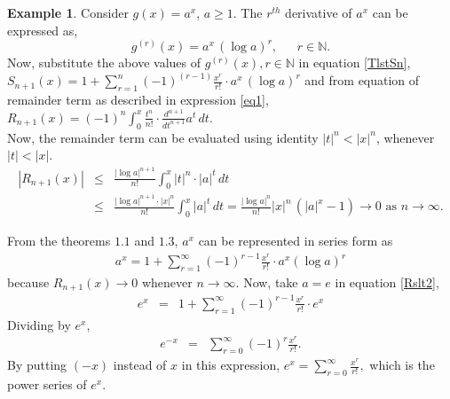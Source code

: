 \documentclass{amsart}
\theoremstyle{definition}
\newtheorem{example}[theorem]{Example}
\theoremstyle{remark}
\numberwithin{equation}{section}
\begin{document}

\begin{example}
Consider $g(x)=a^x$, $a \geq1$. The $r^{th}$ derivative of $a^x$ can be expressed as,
\begin{equation*}
  g^{(r)}(x)=a^x \, (\log a)^r ,~~~~~~~ r\in \mathbb{N}.
\end{equation*}
Now, substitute the above values of $g^{(r)}(x), r\in \mathbb{N}$ in equation \eqref{TlstSn},\\
 $\displaystyle{ S_{n+1}(x)=1+\sum_{r=1}^n (-1)^{(r-1)} \frac{x^r}{r!} \cdot a^x \, (\log a)^r}$
 and from equation of remainder term as described in expression \eqref{eq1},
$\displaystyle{ R_{n+1}(x)=(-1)^n \int_0^x \frac{t^n}{n!} \cdot \frac{d^{n+1}}{dt^{n+1}} a^t \, dt}$.\\
Now, the remainder term can be evaluated using identity $|t|^n < |x|^n$, whenever $|t|<|x|$.
\begin{eqnarray*}
|R_{n+1}(x)| &\leq & \frac{| \log a|^{n+1}}{n!} \int_0^x |t|^n \cdot |a|^t \, dt \\
&\leq & \frac{| \log a|^{n+1} \cdot |x|^n}{n!} \int_0^x  |a|^t \, dt = \frac{|\log a|^n}{n!} |x|^n \,(|a|^x-1) \rightarrow 0 \textrm { as } n \rightarrow \infty .
\end{eqnarray*}

\noindent From the theorems $1.1$ and $1.3$, $a^x$ can be represented in series form as
\begin{eqnarray}
a^x=1+\sum_{r=1}^{\infty} (-1)^{r-1} \frac{x^r}{r!}\cdot a^x(\log a)^r \label{Rslt2}
\end{eqnarray}
because $R_{n+1}(x) \rightarrow 0$ whenever $n \rightarrow \infty$. Now, take $a=e$ in equation \eqref{Rslt2},
\begin{eqnarray*}
e^x &=& 1+\sum_{r=1}^{\infty} (-1)^{r-1} \frac{x^r}{r!}\cdot e^x
\end{eqnarray*}
Dividing by $e^x$,
\begin{eqnarray*}
e^{-x} &=& \sum_{r=0}^{\infty} (-1)^{r} \frac{x^r}{r!}.
\end{eqnarray*}
By putting $(-x)$ instead of $x$ in this expression, $\displaystyle{ e^{x} = \sum_{r=0}^\infty \frac{x^r}{r!}},$ which is the power series of $e^x$.
\end{example}

\end{document}
